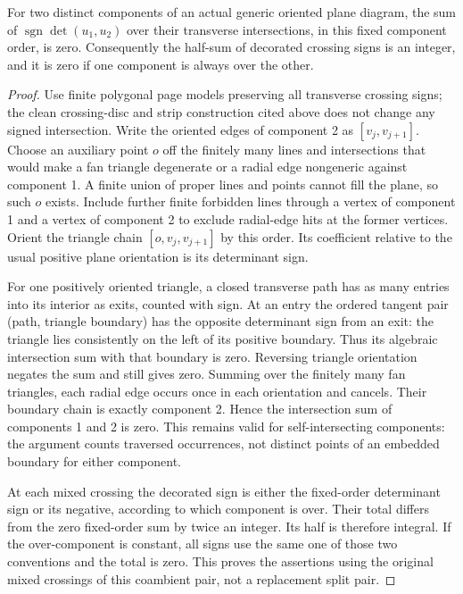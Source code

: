 \begin{lemma}\label{mp:zero-link}\leanok
For two distinct components of an actual generic oriented plane diagram,
the sum of $\operatorname{sgn}\det(u_1,u_2)$ over their transverse
intersections, in this fixed component order, is zero. Consequently
the half-sum of decorated crossing signs is an integer, and it is zero
if one component is always over the other.

\end{lemma}
\begin{proof}\leanok
Use finite polygonal page models preserving all transverse crossing
signs; the clean crossing-disc and strip construction cited above
does not change any signed intersection. Write the oriented edges of
component 2 as $[v_j,v_{j+1}]$. Choose an auxiliary point $o$ off the
finitely many lines and intersections that would make a fan triangle
degenerate or a radial edge nongeneric against component 1. A finite
union of proper lines and points cannot fill the plane, so such $o$
exists. Include further finite forbidden lines through a vertex of
component 1 and a vertex of component 2 to exclude radial-edge hits
at the former vertices. Orient the triangle chain
$[o,v_j,v_{j+1}]$ by this order. Its coefficient relative to the usual
positive plane orientation is its determinant sign.

For one positively oriented triangle, a closed transverse path has
as many entries into its interior as exits, counted with sign. At an
entry the ordered tangent pair (path, triangle boundary) has the
opposite determinant sign from an exit: the triangle lies consistently
on the left of its positive boundary. Thus its algebraic intersection
sum with that boundary is zero. Reversing triangle orientation negates
the sum and still gives zero. Summing over the finitely many fan
triangles, each radial edge occurs once in each orientation and
cancels. Their boundary chain is exactly component 2. Hence the
intersection sum of components 1 and 2 is zero. This remains valid for
self-intersecting components: the argument counts traversed occurrences,
not distinct points of an embedded boundary for either component.

At each mixed crossing the decorated sign is either the fixed-order
determinant sign or its negative, according to which component is
over. Their total differs from the zero fixed-order sum by twice an
integer. Its half is therefore integral. If the over-component is
constant, all signs use the same one of those two conventions and
the total is zero. This proves the assertions using the original mixed
crossings of this coambient pair, not a replacement split pair.
\end{proof}

